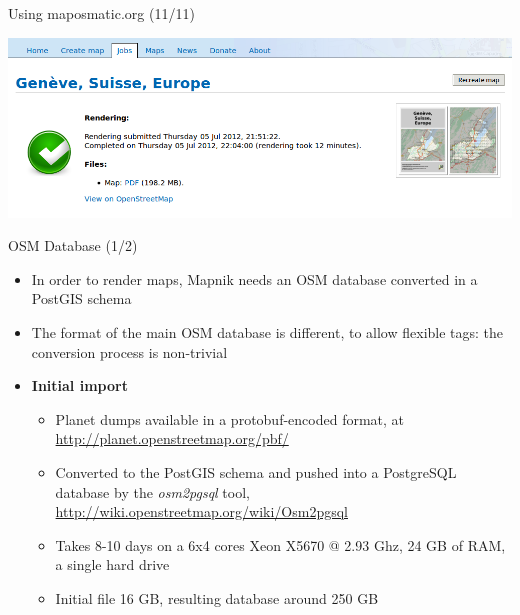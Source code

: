 \documentclass{beamer}
\begin{document}
\begin{frame}{Using maposmatic.org (11/11)}
  \begin{center}
    \includegraphics[width=\textwidth]{screenshot11.png}
  \end{center}
\end{frame}

\begin{frame}{OSM Database (1/2)}
  \begin{itemize}
  \item In order to render maps, Mapnik needs an OSM database
    converted in a PostGIS schema
  \item The format of the main OSM database is different, to allow
    flexible tags: the conversion process is non-trivial
  \item {\bf Initial import}
    \begin{itemize}
    \item Planet dumps available in a protobuf-encoded format, at
      \url{http://planet.openstreetmap.org/pbf/}
    \item Converted to the PostGIS schema and pushed into a PostgreSQL
      database by the {\em osm2pgsql} tool,
      \url{http://wiki.openstreetmap.org/wiki/Osm2pgsql}
    \item Takes 8-10 days on a 6x4 cores Xeon X5670 @ 2.93 Ghz, 24 GB
      of RAM, a single hard drive
    \item Initial file 16 GB, resulting database around 250 GB
    \end{itemize}
  \end{itemize}
\end{frame}
\end{document}
